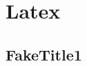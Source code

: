 \documentclass[10pt,fleqn]{beamer}
\begin{document}

	\section{Latex}%
	\subsection{FakeTitle1} %
	
	
\end{document}
